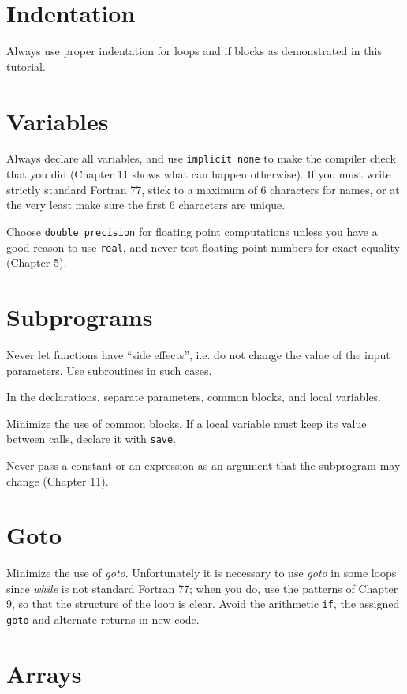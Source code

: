 \section{Indentation}

Always use proper indentation for loops and if blocks as demonstrated in this tutorial.

\section{Variables}

Always declare all variables, and use \texttt{implicit none} to make the compiler check that you did (Chapter 11 shows what can happen otherwise). If you must write strictly standard Fortran 77, stick to a maximum of 6 characters for names, or at the very least make sure the first 6 characters are unique.

Choose \texttt{double precision} for floating point computations unless you have a good reason to use \texttt{real}, and never test floating point numbers for exact equality (Chapter 5).

\section{Subprograms}

Never let functions have ``side effects'', i.e. do not change the value of the input parameters. Use subroutines in such cases.

In the declarations, separate parameters, common blocks, and local variables.

Minimize the use of common blocks. If a local variable must keep its value between calls, declare it with \texttt{save}.

Never pass a constant or an expression as an argument that the subprogram may change (Chapter 11).

\section{Goto}

Minimize the use of \emph{goto}. Unfortunately it is necessary to use \emph{goto} in some loops since \emph{while} is not standard Fortran 77; when you do, use the patterns of Chapter 9, so that the structure of the loop is clear. Avoid the arithmetic \texttt{if}, the assigned \texttt{goto} and alternate returns in new code.

\section{Arrays}

